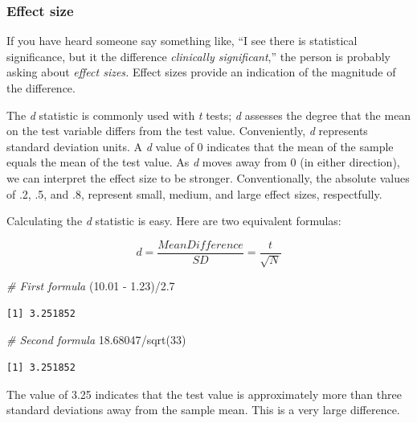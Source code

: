 \documentclass[
  11pt,
]{book}
\newenvironment{Shaded}{\begin{snugshade}}{\end{snugshade}}
\newcommand{\CommentTok}[1]{\textcolor[rgb]{0.56,0.35,0.01}{\textit{#1}}}
\newcommand{\DecValTok}[1]{\textcolor[rgb]{0.00,0.00,0.81}{#1}}
\newcommand{\FloatTok}[1]{\textcolor[rgb]{0.00,0.00,0.81}{#1}}
\newcommand{\FunctionTok}[1]{\textcolor[rgb]{0.00,0.00,0.00}{#1}}
\newcommand{\NormalTok}[1]{#1}
\newcommand{\SpecialCharTok}[1]{\textcolor[rgb]{0.00,0.00,0.00}{#1}}
\begin{document}
\hypertarget{effect-size}{%
\subsubsection{Effect size}\label{effect-size}}

If you have heard someone say something like, ``I see there is statistical significance, but it the difference \emph{clinically significant},'' the person is probably asking about \emph{effect sizes.} Effect sizes provide an indication of the magnitude of the difference.

The \emph{d} statistic is commonly used with \emph{t} tests; \emph{d} assesses the degree that the mean on the test variable differs from the test value. Conveniently, \emph{d} represents standard deviation units. A \emph{d} value of 0 indicates that the mean of the sample equals the mean of the test value. As \emph{d} moves away from 0 (in either direction), we can interpret the effect size to be stronger. Conventionally, the absolute values of .2, .5, and .8, represent small, medium, and large effect sizes, respectfully.

Calculating the \emph{d} statistic is easy. Here are two equivalent formulas:

\[d = \frac{Mean Difference}{SD}=\frac{t}{\sqrt{N}}\]

\begin{Shaded}
\begin{Highlighting}[]
\CommentTok{\# First formula}
\NormalTok{(}\FloatTok{10.01} \SpecialCharTok{{-}} \FloatTok{1.23}\NormalTok{)}\SpecialCharTok{/}\FloatTok{2.7}
\end{Highlighting}
\end{Shaded}

\begin{verbatim}
[1] 3.251852
\end{verbatim}

\begin{Shaded}
\begin{Highlighting}[]
\CommentTok{\# Second formula}
\FloatTok{18.68047}\SpecialCharTok{/}\FunctionTok{sqrt}\NormalTok{(}\DecValTok{33}\NormalTok{)}
\end{Highlighting}
\end{Shaded}

\begin{verbatim}
[1] 3.251852
\end{verbatim}

The value of 3.25 indicates that the test value is approximately more than three standard deviations away from the sample mean. This is a very large difference.
\end{document}
